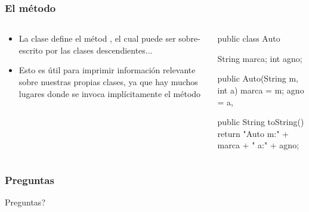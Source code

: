 \documentclass{beamer}
\begin{document}
\begin{frame}[fragile]
  \frametitle{El método }

  \begin{columns}
    \begin{column}{0.35\textwidth}
      \begin{small}
        \begin{itemize}
        \item La clase  define el métod
          , el cual puede ser sobre-escrito por las
          clases descendientes...
          
        \item Esto es útil para imprimir información relevante sobre
          nuestras propias clases, ya que hay muchos lugares donde se
          invoca implícitamente el método 
          
        \end{itemize}
       \end{small}
    \end{column}
    \begin{column}{0.65\textwidth}
      
      \begin{jsmall}        
        public class Auto {
          String marca;
          int agno;

          public Auto(String m, int a) {
            marca = m;
            agno = a,
          }

          public String toString() {
            return "Auto m:" + marca + " a:" + agno;
          }
        }
      \end{jsmall}
      
    \end{column}
  \end{columns}  
  
\end{frame}



\begin{frame}
  \frametitle{Preguntas}
  \hspace{4cm}\huge{Preguntas?}  
\end{frame}
\end{document}
